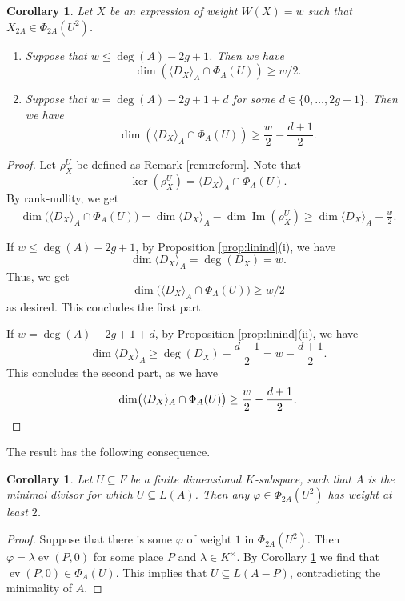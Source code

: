 \documentclass[12pt]{amsart}
\renewcommand{\leq}{\leqslant}
\renewcommand{\geq}{\geqslant}
\DeclareMathOperator{\ev}{ev}
\newtheorem{corollary}[theorem]{Corollary}
\theoremstyle{definition}
\newcommand{\divi}[1]{\langle #1 \rangle}
\begin{document}
	\begin{corollary}\label{cor:m_dimension}
		Let $X$ be an expression of weight $W(X) = w$ such that $X_{2A} \in \Phi_{2A}(U^2)$.
		\begin{enumerate}[\normalfont (i)]
			\item Suppose that $w \leq  \deg(A) -2g +1 $. Then we have
			$$ \dim (\divi{D_X}_A  \cap \Phi_{A} (U) )\ge w/2. $$
			\item Suppose that  $w = \deg(A) -2g +1+d $ for some $d \in \{0,\ldots, 2g +1\}$.  Then we have
			$$ \dim( \divi{D_X}_A  \cap \Phi_{A} (U))\ge \frac{w}{2}-\frac{d+1}{2}.$$ 
		\end{enumerate}
	\end{corollary}
	\begin{proof}
		Let $\rho_X^U$ be defined as Remark \ref{rem:reform}. Note that 
		$$\ker (\rho_X^U)=  \divi{D_X}_A  \cap \Phi_A (U) .$$
		By rank-nullity, we get
		\begin{align*}
			\dim\bigl(\divi{D_X}_A\cap \Phi_A(U)\bigr)
			= \dim \divi{D_X}_A-\dim \operatorname{Im}(\rho_X^U)  \geq \dim \divi{D_X}_A-\frac{w}{2}.
		\end{align*}
		
		If $w\le \deg(A) -2g+1 $, by Proposition \ref{prop:linind}(i), we have
		$$\dim \divi{D_X}_A =\deg ({D_X} )=w. $$
		Thus, we get
		$$ \dim\bigl(\divi{D_X}_A\cap \Phi_A(U)\bigr)\ge w/2$$
		as desired. This concludes the first part. 
		
		If $ w =  \deg(A) -2g +1+d $, by Proposition \ref{prop:linind}(ii), we have
		$$\dim \divi{D_X}_A \ge \deg (D_X ) -\frac{d+1}{2} =w -\frac{d+1}{2}.$$
		This concludes the second part, as we have
		\begin{equation*} \dim\bigl(\divi{D_X}_A\cap \Phi_A(U)\bigr)\ge \frac w2 -\frac{d+1}{2}. \qedhere \end{equation*}
	\end{proof}
	
	The result has the following consequence. 
	\begin{corollary} \label{cor:weight2}
		Let $U \subseteq F$ be a finite dimensional $K$-subspace, such that $A$ is the minimal divisor for which $U \subseteq L(A)$. Then any $\varphi \in \Phi_{2A}(U^2)$ has weight at least $2$. 
	\end{corollary}
	\begin{proof}
		Suppose that there is some $\varphi$ of weight $1$ in $\Phi_{2A}(U^2)$. Then $\varphi = \lambda \ev(P, 0)$ for some place $P$ and $\lambda \in K^\times$. By Corollary \ref{cor:m_dimension} we find that $\ev(P, 0) \in \Phi_{A}(U)$. This implies that $U \subseteq L(A-P)$, contradicting the minimality of $A$. 
	\end{proof}
	
\end{document}
